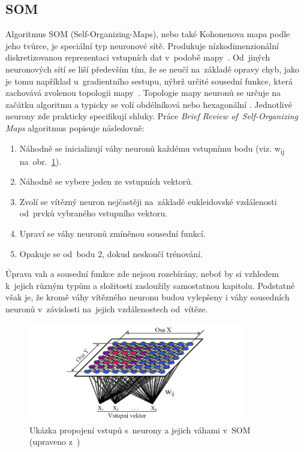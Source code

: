 \subsection{SOM}
Algoritmus SOM (Self-Organizing-Maps), nebo také Kohonenova mapa podle jeho tvůrce, je speciální typ neuronové sítě. Produkuje nízkodimenzionální diskretizovanou reprezentaci vstupních dat v~podobě mapy~\cite{som-web}. Od~jiných neuronových sítí se liší především tím, že se neučí na~základě opravy chyb, jako je tomu například u~gradientního sestupu, nýbrž určité sousední funkce, která zachovává zvolenou topologii mapy~\cite{som-web}. Topologie mapy neuronů se určuje na začátku algoritmu a typicky se volí obdélníková nebo hexagonální \cite{data-science-concepts-and-practice}. Jednotlivé neurony zde prakticky specifikují shluky. Práce \emph{Brief Review of~Self-Organizing Maps} \cite{som-article} algoritmus popisuje následovně:

\begin{enumerate}
    \item Náhodně se inicializují váhy neuronů každému vstupnímu bodu (viz. w\textsubscript{ij} na~obr.~\ref{som-img}).
    \item Náhodně se vybere jeden ze vstupních vektorů.
    \item Zvolí se vítězný neuron nejčastěji na~základě eukleidovské vzdálenosti od~prvků vybraného vstupního vektoru.
    \item Upraví se váhy neuronů zmíněnou sousední funkcí.
    \item Opakuje se od~bodu 2, dokud neskončí trénování.
\end{enumerate}

Úprava vah a sousední funkce zde nejsou rozebírány, neboť by si vzhledem k~jejich různým typům a složitosti zasloužily samostatnou kapitolu. Podstatné však je, že kromě váhy vítězného neuronu budou vylepšeny i váhy sousedních neuronů v~závislosti na~jejich vzdálenostech od~vítěze.

\begin{figure}[hbt]
	\centering
	\includegraphics[width=0.85\textwidth]{obrazky/som.png}
	\caption{Ukázka propojení vstupů s~neurony a jejich váhami v~SOM (upraveno z~\cite{som-web})}
	\label{som-img}
\end{figure}


